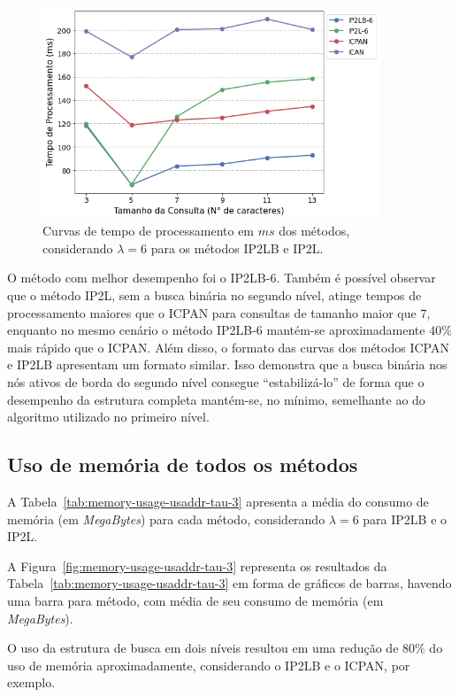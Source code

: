 \begin{figure}[ht]
    \centering
    \includegraphics[width=0.9\textwidth]{figures/performance_baselines_dataset_usaddr_tau_3.png}
    \caption{Curvas de tempo de processamento em $ms$ dos métodos, considerando $\lambda = 6$ para os métodos IP2LB e IP2L.}
    \label{fig:performance-usaddr-tau-3}
\end{figure}

O método com melhor desempenho foi o IP2LB-6. Também é possível observar que o método IP2L, sem a busca binária no segundo nível, atinge tempos de processamento maiores que o ICPAN para consultas de tamanho maior que $7$, enquanto no mesmo cenário o método IP2LB-6 mantém-se aproximadamente $40\%$ mais rápido que o ICPAN. Além disso, o formato das curvas dos métodos ICPAN e IP2LB apresentam um formato similar. Isso demonstra que a busca binária nos nós ativos de borda do segundo nível consegue ``estabilizá-lo'' de forma que o desempenho da estrutura completa mantém-se, no mínimo, semelhante ao do algoritmo utilizado no primeiro nível.

\subsection{Uso de memória de todos os métodos}

A Tabela~\ref{tab:memory-usage-usaddr-tau-3} apresenta a média do consumo de memória (em \textit{MegaBytes}) para cada método, considerando $\lambda=6$ para IP2LB e o IP2L.

A Figura~\ref{fig:memory-usage-usaddr-tau-3} representa os resultados da Tabela~\ref{tab:memory-usage-usaddr-tau-3} em forma de gráficos de barras, havendo uma barra para método, com média de seu consumo de memória (em \textit{MegaBytes}).

O uso da estrutura de busca em dois níveis resultou em uma redução de $80\%$ do uso de memória aproximadamente, considerando o IP2LB e o ICPAN, por exemplo.

